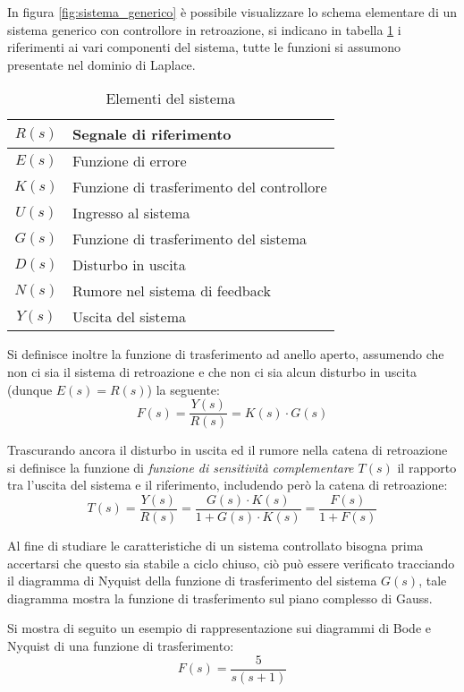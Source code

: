 In figura \ref{fig:sistema_generico} è possibile visualizzare lo schema elementare di un sistema generico con controllore in retroazione, si indicano in tabella \ref{tab:elementi_sistema} i riferimenti ai vari componenti del sistema, tutte le funzioni si assumono presentate nel dominio di Laplace.
\begin{table}[h]\centering
    \begin{tabular}{c | l}
        $R(s)$ & Segnale di riferimento                    \\ \hline
        $E(s)$ & Funzione di errore                        \\ \hline
        $K(s)$ & Funzione di trasferimento del controllore \\ \hline
        $U(s)$ & Ingresso al sistema                       \\ \hline
        $G(s)$ & Funzione di trasferimento del sistema     \\ \hline
        $D(s)$ & Disturbo in uscita                        \\ \hline
        $N(s)$ & Rumore nel sistema di feedback            \\ \hline
        $Y(s)$ & Uscita del sistema
    \end{tabular}
    \caption{Elementi del sistema}
    \label{tab:elementi_sistema}
\end{table}

Si definisce inoltre la funzione di trasferimento ad anello aperto, assumendo che non ci sia il sistema di retroazione e che non ci sia alcun disturbo in uscita (dunque $E(s) = R(s)$) la seguente:
$$
    F(s) = \frac{Y(s)}{R(s)} = K(s)\cdot G(s)
$$

Trascurando ancora il disturbo in uscita ed il rumore nella catena di retroazione si definisce la funzione di \textit{funzione di sensitività complementare $T(s)$} il rapporto tra l'uscita del sistema e il riferimento, includendo però la catena di retroazione:
$$
    T(s) = \frac{Y(s)}{R(s)} = \frac{G(s)\cdot K(s)}{1 + G(s)\cdot K(s)} =\frac{F(s)}{1+F(s)}
$$

Al fine di studiare le caratteristiche di un sistema controllato bisogna prima accertarsi che questo sia stabile a ciclo chiuso, ciò può essere verificato tracciando il diagramma di Nyquist della funzione di trasferimento del sistema $G(s)$, tale diagramma mostra la funzione di trasferimento sul piano complesso di Gauss.

\newpage
Si mostra di seguito un esempio di rappresentazione sui diagrammi di Bode e Nyquist di una funzione di trasferimento:
\begin{equation}
    F(s) = \frac{5}{s(s+1)}
    \label{eq:trasferimento_es_1}
\end{equation}

